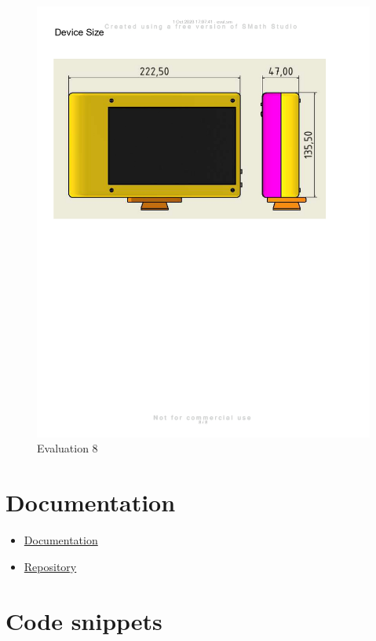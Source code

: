 \begin{figure}[H]
    \centering
    \includegraphics[width=\linewidth]{texs/appendix/data/evaluation/eval_page-0008.jpg}
    \caption{Evaluation 8}
    \label{fig:evaluation-8}
\end{figure}

\section{Documentation}
\label{appendix:documentation}

\begin{itemize}
    \item \href{https://haziqsabtu.github.io/SpeedCameraPi/}{Documentation}
    \item \href{https://github.com/HaziqSabtu/SpeedCameraPi}{Repository}
\end{itemize}

\section{Code snippets}

